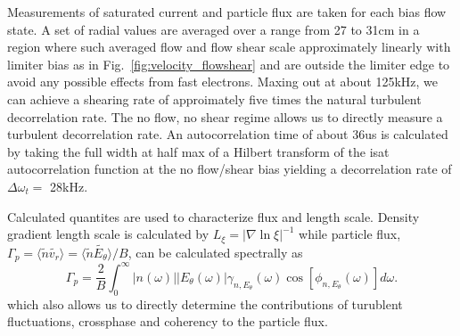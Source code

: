 \documentclass[%
 aps,
 prl,
 amsmath,amssymb,
 reprint,%
]{revtex4-1}
\begin{document}
Measurements of saturated current and particle flux are taken for each bias flow state. A set of radial values are averaged over a range from 27 to 31cm in a region where such averaged flow and flow shear scale approximately linearly with limiter bias as in 
Fig.~\ref{fig:velocity_flowshear}%
and are outside the limiter edge to avoid any possible effects from fast electrons. Maxing out at about 125kHz, we can achieve a shearing rate of approimately five times the natural turbulent decorrelation rate. The no flow, no shear regime allows us to directly measure a turbulent decorrelation rate. An autocorrelation time of about 36us is calculated by taking the full width at half max of a Hilbert transform of the isat autocorrelation function at the no flow/shear bias yielding a decorrelation rate of $\Delta \omega_{t} = $ 28kHz.

Calculated quantites are used to characterize flux and length scale. Density gradient length scale is calculated by $L_{\xi} = \lvert \nabla \ln \xi \rvert ^{-1}$ while particle flux, $\Gamma_{p} = \langle \tilde{n} \tilde{v_{r}} \rangle = \langle \tilde{n} \tilde{E_{\theta}} \rangle /B$, can be calculated spectrally as
\begin{equation}
\Gamma_{p} = \frac{2}{B} \int^{\infty}_{0} \lvert n(\omega) \rvert \lvert E_{\theta}(\omega) \rvert \gamma_{n,E_{\theta}}(\omega) \cos [\phi_{n,E_{\theta}}(\omega)] d\omega.
\label{eq:fluxint}
\end{equation}
which also allows us to directly determine the contributions of turublent fluctuations, crossphase and coherency to the particle flux.


\end{document}
